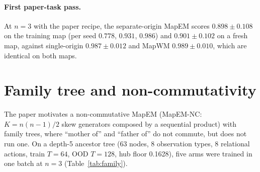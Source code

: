 \documentclass[10pt]{article}
\begin{document}
\paragraph{First paper-task pass.} At $n=3$ with the paper recipe, the separate-origin MapEM scores
$0.898\pm0.108$ on the training map (per seed $0.778$, $0.931$, $0.986$) and $0.901\pm0.102$ on a fresh map,
against single-origin $0.987\pm0.012$ and MapWM $0.989\pm0.010$, which are identical on both maps. %

\section{Family tree and non-commutativity}
\label{app:family}

The paper motivates a non-commutative MapEM (MapEM-NC: $K=n(n-1)/2$ skew generators composed by a
sequential product) with family trees, where ``mother of'' and ``father of'' do not commute, but does not run
one. On a depth-5 ancestor tree (63 nodes, 8 observation types, 8 relational actions, train $T=64$, OOD
$T=128$, hub floor 0.1628), five arms were trained in one batch at $n=3$ (Table~\ref{tab:family}).
\end{document}
